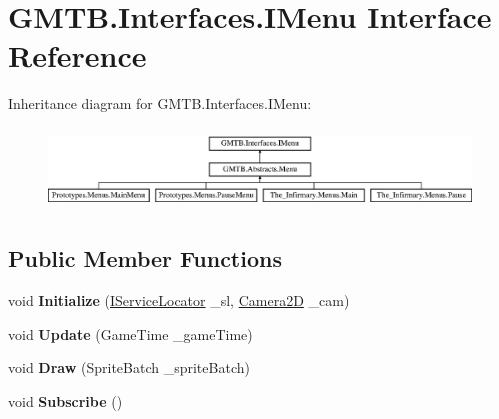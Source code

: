 \hypertarget{interface_g_m_t_b_1_1_interfaces_1_1_i_menu}{}\section{G\+M\+T\+B.\+Interfaces.\+I\+Menu Interface Reference}
\label{interface_g_m_t_b_1_1_interfaces_1_1_i_menu}
Inheritance diagram for G\+M\+T\+B.\+Interfaces.\+I\+Menu\+:\begin{figure}[H]
\begin{center}
\leavevmode
\includegraphics[height=2.176166cm]{interface_g_m_t_b_1_1_interfaces_1_1_i_menu}
\end{center}
\end{figure}
\subsection*{Public Member Functions}
\begin{DoxyCompactItemize}
\item 
\mbox{\label{interface_g_m_t_b_1_1_interfaces_1_1_i_menu_ac847fdf14e08f8ef6ff2343f74c125a4}} 
void {\bfseries Initialize} (\mbox{\hyperlink{interface_g_m_t_b_1_1_interfaces_1_1_i_service_locator}{I\+Service\+Locator}} \+\_\+sl, \mbox{\hyperlink{class_g_m_t_b_1_1_camera2_d}{Camera2D}} \+\_\+cam)
\item 
\mbox{\label{interface_g_m_t_b_1_1_interfaces_1_1_i_menu_ab5ba7b40b3205f039d214f654edc44d1}} 
void {\bfseries Update} (Game\+Time \+\_\+game\+Time)
\item 
\mbox{\label{interface_g_m_t_b_1_1_interfaces_1_1_i_menu_a126e5e343cee1961460400a96f4cfadc}} 
void {\bfseries Draw} (Sprite\+Batch \+\_\+sprite\+Batch)
\item 
\mbox{\label{interface_g_m_t_b_1_1_interfaces_1_1_i_menu_a67683e3b5b8f7d4680f80faab72694b2}} 
void {\bfseries Subscribe} ()
\end{DoxyCompactItemize}
